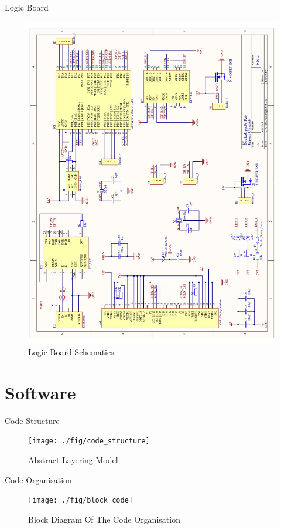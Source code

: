 \documentclass[apectratio=169]{beamer}
\begin{document}
  	\begin{frame}{Logic Board}	
		\begin{figure}
			\centering
			\includegraphics[height=0.8\textheight]{./fig/logic}
			\caption{Logic Board Schematics}
		\end{figure}
	\end{frame}

  \section{Software}
  	\begin{frame}{Code Structure}
		 \begin{figure}
                        \centering
                        \texttt{[image: ./fig/code\_structure]}
                        \caption{Abstract Layering Model}
                \end{figure}
  	\end{frame}
	\begin{frame}{Code Organisation}
		 \begin{figure}
                        \centering
                        \texttt{[image: ./fig/block\_code]}
                        \caption{Block Diagram Of The Code Organisation}
                \end{figure}
  	\end{frame}
\end{document}
